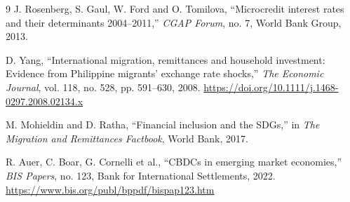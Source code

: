 \documentclass[
  11pt,
]{article}
\begin{document}
\begin{thebibliography}{9}
J. Rosenberg, S. Gaul, W. Ford and O. Tomilova,
``Microcredit interest rates and their determinants 2004--2011,''
\emph{CGAP Forum}, no. 7, World Bank Group, 2013.

D. Yang,
``International migration, remittances and household investment: Evidence from Philippine migrants' exchange rate shocks,''
\emph{The Economic Journal}, vol. 118, no. 528, pp. 591--630, 2008.
\url{https://doi.org/10.1111/j.1468-0297.2008.02134.x}

M. Mohieldin and D. Ratha,
``Financial inclusion and the SDGs,''
in \emph{The Migration and Remittances Factbook}, World Bank, 2017.

R. Auer, C. Boar, G. Cornelli et al.,
``CBDCs in emerging market economies,''
\emph{BIS Papers}, no. 123, Bank for International Settlements, 2022.
\url{https://www.bis.org/publ/bppdf/bispap123.htm}

\end{thebibliography}
\end{document}
